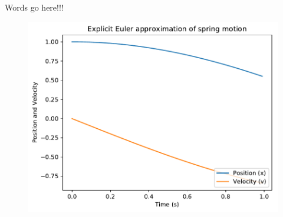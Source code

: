 \documentclass{article}
\begin{document}
Words go here!!!

\begin{figure}[h]
	\centering
	\includegraphics{out1.pdf}
\end{figure}
\end{document}
